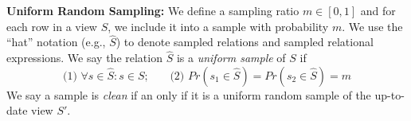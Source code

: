 \noindent \textbf{Uniform Random Sampling: }
We define a sampling ratio $m\in [0,1]$ and for each row in a view $S$, we include it into a sample with probability $m$.
We use the ``hat'' notation (e.g., $\widehat{S}$) to denote sampled relations and sampled relational expressions.
We say the relation $\widehat{S}$ is a \emph{uniform sample} of $S$ if
\[\text{(1) } \forall s \in \widehat{S} : s \in S\text{;~~~~~ (2) }Pr(s_1 \in \widehat{S}) =  Pr(s_2 \in \widehat{S}) = m\]
We say a sample is \emph{clean} if an only if it is a uniform random sample of the up-to-date view $S'$. 

